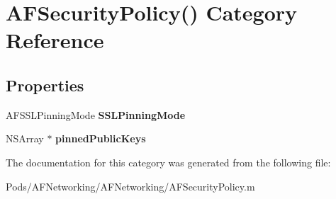 \hypertarget{category_a_f_security_policy_07_08}{}\section{A\+F\+Security\+Policy() Category Reference}
\label{category_a_f_security_policy_07_08}
\subsection*{Properties}
\begin{DoxyCompactItemize}
\item 
\mbox{\label{category_a_f_security_policy_07_08_ab6ba20973c5b11aa85eb8771cd339279}} 
A\+F\+S\+S\+L\+Pinning\+Mode {\bfseries S\+S\+L\+Pinning\+Mode}
\item 
\mbox{\label{category_a_f_security_policy_07_08_a8b8a4d6bc3a009e4707ff0f069eb0dd6}} 
N\+S\+Array $\ast$ {\bfseries pinned\+Public\+Keys}
\end{DoxyCompactItemize}


The documentation for this category was generated from the following file\+:\begin{DoxyCompactItemize}
\item 
Pods/\+A\+F\+Networking/\+A\+F\+Networking/A\+F\+Security\+Policy.\+m\end{DoxyCompactItemize}
